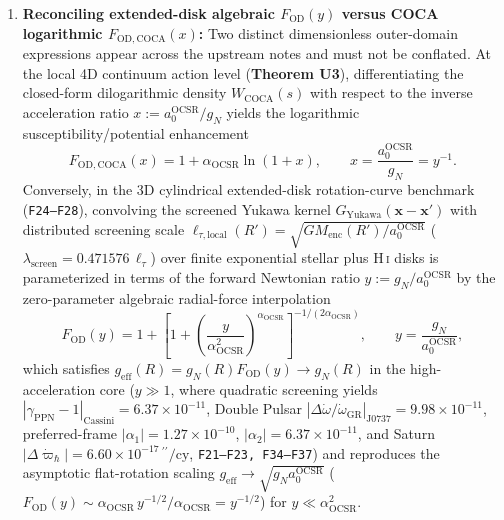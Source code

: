 \documentclass[11pt]{article}
\begin{document}
\begin{enumerate}[leftmargin=1.8em]
\item \textbf{Reconciling extended-disk algebraic $F_{\mathrm{OD}}(y)$ versus COCA logarithmic $F_{\mathrm{OD,COCA}}(x)$:}
Two distinct dimensionless outer-domain expressions appear across the upstream notes and must not be conflated. At the local 4D continuum action level (\textbf{Theorem U3}), differentiating the closed-form dilogarithmic density $W_{\mathrm{COCA}}(s)$ with respect to the inverse acceleration ratio $x := a_0^{\mathrm{OCSR}}/g_N$ yields the logarithmic susceptibility/potential enhancement
\[
F_{\mathrm{OD,COCA}}(x) = 1 + \alpha_{\mathrm{OCSR}}\ln(1+x), \qquad x = \frac{a_0^{\mathrm{OCSR}}}{g_N} = y^{-1}.
\]
Conversely, in the 3D cylindrical extended-disk rotation-curve benchmark (\texttt{F24--F28}), convolving the screened Yukawa kernel $G_{\mathrm{Yukawa}}(\mathbf{x}-\mathbf{x}')$ with distributed screening scale $\ell_{\tau,\mathrm{local}}(R')=\sqrt{GM_{\mathrm{enc}}(R')/a_0^{\mathrm{OCSR}}}$ ($\lambda_{\mathrm{screen}}=0.471576\,\ell_\tau$) over finite exponential stellar plus H\,\textsc{i} disks is parameterized in terms of the forward Newtonian ratio $y := g_N/a_0^{\mathrm{OCSR}}$ by the zero-parameter algebraic radial-force interpolation
\[
F_{\mathrm{OD}}(y) = 1 + \left[1 + \left(\frac{y}{\alpha_{\mathrm{OCSR}}^2}\right)^{\alpha_{\mathrm{OCSR}}}\right]^{-1/(2\alpha_{\mathrm{OCSR}})}, \qquad y = \frac{g_N}{a_0^{\mathrm{OCSR}}},
\]
which satisfies $g_{\mathrm{eff}}(R)=g_N(R)F_{\mathrm{OD}}(y)\to g_N(R)$ in the high-acceleration core ($y\gg 1$, where quadratic screening yields $|\gamma_{\mathrm{PPN}}-1|_{\mathrm{Cassini}}=6.37\times 10^{-11}$, Double Pulsar $|\Delta\dot{\omega}/\dot{\omega}_{\mathrm{GR}}|_{\mathrm{J0737}}=9.98\times 10^{-11}$, preferred-frame $|\alpha_1|=1.27\times 10^{-10}$, $|\alpha_2|=6.37\times 10^{-11}$, and Saturn $|\Delta\dot{\varpi}_{\hbar}|=6.60\times 10^{-17}\,{}^{\prime\prime}/\mathrm{cy}$, \texttt{F21--F23, F34--F37}) and reproduces the asymptotic flat-rotation scaling $g_{\mathrm{eff}}\to\sqrt{g_N a_0^{\mathrm{OCSR}}}$ ($F_{\mathrm{OD}}(y)\sim \alpha_{\mathrm{OCSR}}\,y^{-1/2}/\alpha_{\mathrm{OCSR}}=y^{-1/2}$) for $y\ll \alpha_{\mathrm{OCSR}}^2$.


\end{enumerate}
\end{document}

